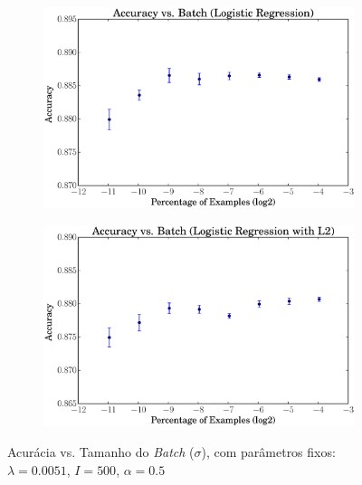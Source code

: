 \documentclass[a4paper, 12pt]{article}
\begin{document}
\begin{figure}[htpb]
\begin{subfigure}[htpb]{0.45\textwidth}
        \caption{}
        \label{fig:batch_linregL2}
    \end{subfigure}
    \hfill %
    \begin{subfigure}[htpb]{0.45\textwidth}
        \includegraphics[width=\textwidth]{acc_vs_batchp_logreg}
        \caption{}
        \label{fig:batch_logreg}
    \end{subfigure}
    \begin{subfigure}[htpb]{0.45\textwidth}
        \includegraphics[width=\textwidth]{acc_vs_batchp_logregL2}
        \caption{}
        \label{fig:batch_logregL2}
    \end{subfigure}
    \caption{Acurácia vs. Tamanho do \textit{Batch} ($\sigma$), com
    parâmetros fixos: $\lambda=0.0051$, $I=500$, $\alpha=0.5$}\label{fig:batch}
\end{figure}
\end{document}
